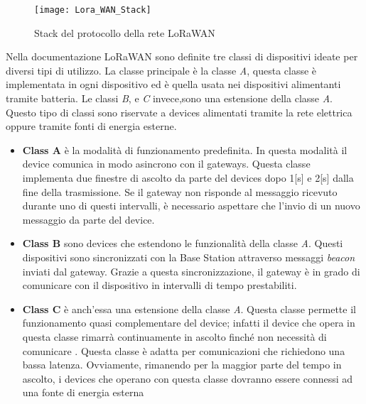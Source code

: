 \begin{figure}[h]
\centering 
\texttt{[image: Lora\_WAN\_Stack]}
\caption{Stack del protocollo della rete LoRaWAN}
\label{fig:stack_lora}
\end{figure}

Nella documentazione LoRaWAN sono definite tre classi di dispositivi ideate per 
diversi tipi di utilizzo. La classe principale è la classe \emph{A}, questa
classe è implementata in ogni dispositivo ed è quella usata nei dispositivi
alimentanti tramite batteria. Le classi \emph{B}, e
\emph{C} invece,sono una estensione della classe \emph{A}. Questo tipo di classi sono
riservate a devices  alimentati tramite la rete elettrica oppure tramite 
fonti di energia esterne.  
\begin{itemize}
        \item   \textbf{Class A} è la modalità di funzionamento predefinita. 
                In questa modalità il device comunica in modo asincrono con il
                gateways. Questa classe implementa due finestre di ascolto da parte del devices
                dopo 1[s] e 2[s] dalla fine della trasmissione. Se il gateway non risponde al
                messaggio ricevuto durante uno di questi intervalli, è necessario aspettare che
                l'invio di un nuovo messaggio da parte del device.

        \item   \textbf{Class B} sono devices che estendono le funzionalità della classe
                \emph{A}. Questi dispositivi sono sincronizzati con la Base Station attraverso
                messaggi \emph{beacon} inviati dal gateway. Grazie a questa
                sincronizzazione, il gateway è in grado di comunicare con il
                dispositivo in intervalli di tempo prestabiliti.

        \item   \textbf{Class C} è anch'essa una estensione della classe \emph{A}. 
                Questa classe permette il funzionamento quasi complementare del device; infatti
                il device che opera in questa classe rimarrà continuamente in ascolto finché non
                necessità di comunicare . Questa classe è adatta per
                comunicazioni che richiedono una bassa latenza. Ovviamente, rimanendo per la
                maggior parte del tempo in ascolto, i devices che operano con questa classe
                dovranno essere connessi ad una fonte di energia esterna 
\end{itemize}


